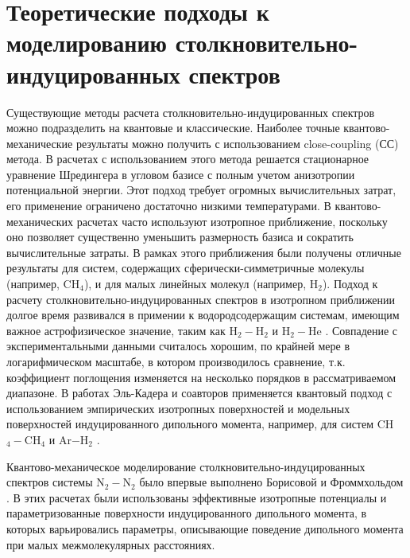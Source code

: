\section{Теоретические подходы к моделированию столкновительно-индуцированных спектров}

Существующие методы расчета столкновительно-индуцированных спектров можно подразделить на квантовые и классические. Наиболее точные квантово-механические результаты можно получить с использованием close-coupling (СС) метода. В расчетах с использованием этого метода решается стационарное уравнение Шредингера в угловом базисе с полным учетом анизотропии потенциальной энергии. Этот подход требует огромных вычислительных затрат, его применение ограничено достаточно низкими температурами. В квантово-механических расчетах часто используют изотропное приближение, поскольку оно позволяет существенно уменьшить размерность базиса и сократить вычислительные затраты. В рамках этого приближения были получены отличные результаты для систем, содержащих сферически-симметричные молекулы (например, CH$_4$), и для малых линейных молекул (например, H$_2$). Подход к расчету столкновительно-индуцированных спектров в изотропном приближении долгое время развивался в примении к водородсодержащим системам, имеющим важное астрофизическое значение, таким как H$_2-$H$_2$ \cite{abel2009} и H$_2-$He \cite{abel2012}. Совпадение с экспериментальными данными считалось хорошим, по крайней мере в логарифмическом масштабе, в котором производилось сравнение, т.к. коэффициент поглощения изменяется на несколько порядков в рассматриваемом диапазоне. В работах Эль-Кадера и соавторов применяется квантовый подход с использованием эмпирических изотропных поверхностей и модельных поверхностей индуцированного дипольного момента, например, для систем CH$_4-$CH$_4$ \cite{elkader2012} и Ar$-$H$_2$ \cite{elkader2017}. \par
Квантово-механическое моделирование столкновительно-индуцированных спектров системы N$_2-$N$_2$ было впервые выполнено Борисовой и Фроммхольдом \cite{borysow1986}. В этих расчетах были использованы эффективные изотропные потенциалы и параметризованные поверхности индуцированного дипольного момента, в которых варьировались параметры, описывающие поведение дипольного момента при малых межмолекулярных расстояниях. \par
